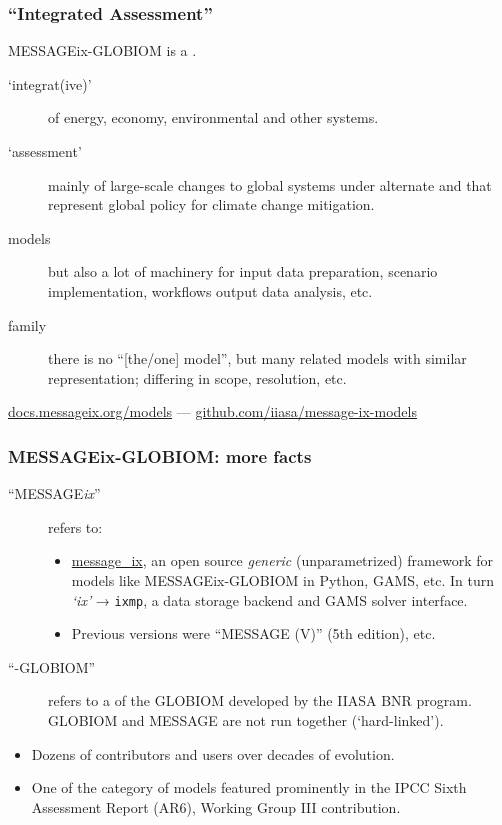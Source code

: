 \documentclass[12pt,aspectratio=169]{beamer}
\begin{document}
\begin{frame}
\frametitle{“Integrated Assessment”}

MESSAGEix-GLOBIOM is a .

\bigskip
\begin{description}
  \item [‘integrat(ive)’] of energy, economy, environmental and other systems.
  \item [‘assessment’] mainly of large-scale changes to global systems under alternate  and  that represent global policy for climate change mitigation.
  \item [models] but also a lot of machinery for input data preparation, scenario implementation, workflows output data analysis, etc.
  \item [family] there is no “[the/one] model”, but many related models with similar representation; differing in scope, resolution, etc.
\end{description}

\bigskip
\centering
\href{https://docs.messageix.org/models}{docs.messageix.org/models} —
\href{https://github.com/iiasa/message-ix-models}{github.com/iiasa/message-ix-models}

\end{frame}


\begin{frame}
\frametitle{MESSAGEix-GLOBIOM: more facts}

\begin{description}
  \item [“MESSAGE\emph{ix}”] refers to:

  \begin{itemize}
    \item \href{https://docs.messageix.org}{\ttfamily message\_ix}, an open source \emph{generic} (unparametrized) framework for models like MESSAGEix-GLOBIOM in Python, GAMS, etc. In turn \emph{‘ix’} → \texttt{ixmp}, a data storage backend and GAMS solver interface.
    \item Previous versions were “MESSAGE (V)” (5th edition), etc.
  \end{itemize}

  \item [“-GLOBIOM”] refers to a  of the GLOBIOM developed by the IIASA BNR program.
  GLOBIOM and MESSAGE are not run together (‘hard-linked’).
\end{description}

\bigskip
\begin{itemize}
  \item Dozens of contributors and users over decades of evolution.
  \item One of the category of models featured prominently in the IPCC Sixth Assessment Report (AR6), Working Group III contribution.
\end{itemize}
\end{frame}
\end{document}
